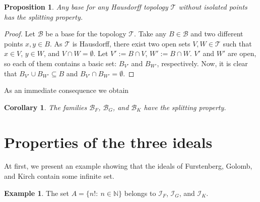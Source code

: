 \documentclass{amsart}
\newtheorem{prop}[thm]{Proposition}
\newtheorem{cor}[thm]{Corollary}
\theoremstyle{definition}
\newtheorem{ex}[thm]{Example}
\newcommand{\N}{{\mathbb N}}
\newcommand{\I}{\mathcal I}
\newcommand{\T}{\mathcal{T}}
\newcommand{\B}{\mathcal{B}}
\begin{document}
\begin{prop} \label{remH}
Any base for any Hausdorff topology $\T$ without isolated points has the splitting property.
\end{prop}

\begin{proof}
Let $\B$ be a base for the topology $\T$. Take any $B\in\B$ and two different points $x,y\in B$. As $\T$ is Hausdorff, there exist two open sets $V,W\in\T$ such that $x\in V$, $y\in W$, and $V\cap W = \emptyset$. Let $V':=B\cap V$, $W':=B\cap W$. $V'$ and $W'$ are open, so each of them contains a basic set: $B_{V'}$ and $B_{W'}$, respectively. Now, it is clear that $B_{V'}\cup B_{W'}\subseteq B$ and $B_{V'}\cap B_{W'}=\emptyset$.
\end{proof}

As an immediate consequence we obtain

\begin{cor}
The families $\B_F$, $\B_G$, and $\B_K$ have the splitting property.
\end{cor}

\section{Properties of the three ideals}\label{examples}

At first, we present an example showing that the ideals of Furstenberg, Golomb, and Kirch contain some infinite set.

\begin{ex} 
The set $A = \{n! :\ n\in\N\}$ belongs to $\I_F$, $\I_G$, and $\I_K$.
\end{ex}
\end{document}
